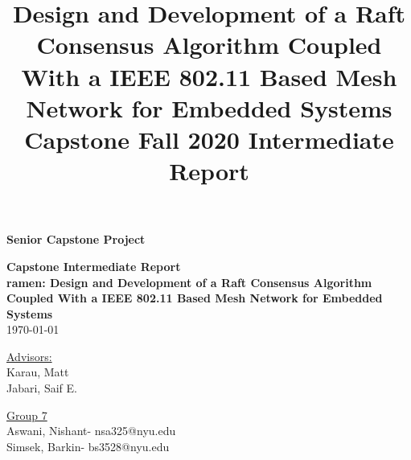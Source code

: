 \documentclass[compsoc]{IEEEtran}
\makeatletter
\newcommand{\studentOneName}{Aswani, Nishant}
\newcommand{\studentTwoName}{Simsek, Barkin}
\newcommand{\studentOneEmail}{nsa325@nyu.edu}
\newcommand{\studentTwoEmail}{bs3528@nyu.edu}
\newcommand{\advisorOneName}{Karau, Matt}
\newcommand{\advisorTwoName}{Jabari, Saif E.}
\newcommand{\group}{Group 7}
\makeatother
\begin{document}
\begin{titlepage}

 \begin{center}
 \textbf{\large Senior Capstone Project}
       \vspace*{\fill}

        \textbf {Capstone Intermediate Report\\}
        \textbf {\large ramen: Design and Development of a Raft Consensus Algorithm \\Coupled With a IEEE 802.11 Based Mesh Network for Embedded Systems\\}
        \today
      
        \vfill
            
     \underline {Advisors:}\\
       \advisorOneName\\
       \advisorTwoName\\
       
            
       \vspace{0.8cm}
     
            
       \underline {\group}\\
       \studentOneName - \studentOneEmail\\
       \studentTwoName - \studentTwoEmail\\
      
            
   \end{center}
\end{titlepage}

\tableofcontents

\title{\LARGE Design and Development of a Raft Consensus Algorithm Coupled With a IEEE 802.11 Based Mesh Network for Embedded Systems
\\ 

{\Large Capstone Fall 2020 Intermediate Report}
}

\author{
    
    \and
    
}


\newpage
\end{document}
